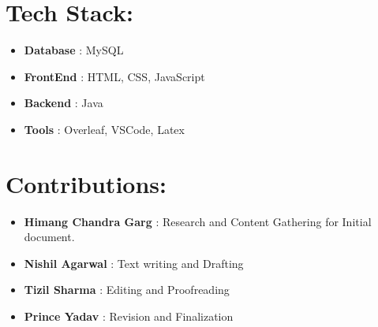 \documentclass{article}
\begin{document}
\section{Tech Stack:}
\begin{itemize}
    \item \textbf{Database} : MySQL
    \item \textbf{FrontEnd} : HTML, CSS, JavaScript
    \item \textbf{Backend} : Java
    \item \textbf{Tools} : Overleaf, VSCode, Latex
    
    \end{itemize}
    
\section{Contributions:}
\begin{itemize}
    \item \textbf{Himang Chandra Garg} : Research and Content Gathering for Initial document.
    \item \textbf{Nishil Agarwal} : Text writing and Drafting
    \item \textbf{Tizil Sharma} : Editing and Proofreading
    \item \textbf{Prince Yadav} : Revision and Finalization
    \end{itemize}
\end{document}
